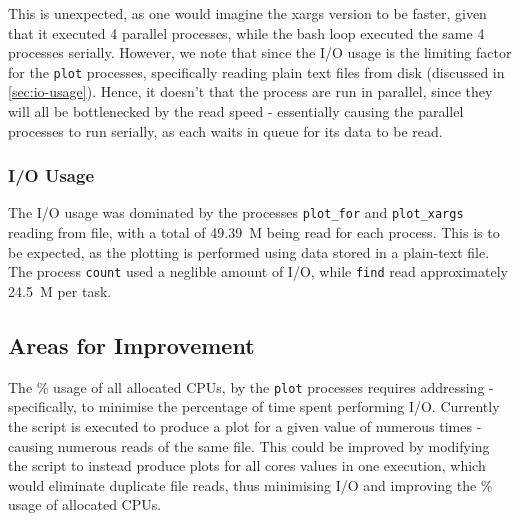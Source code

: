 \documentclass{article}
\begin{document}
This is unexpected, as one would imagine the xargs version to be faster, given
that it executed 4 parallel processes, while the bash loop executed the same 4
processes serially.
However, we note that since the I/O usage is the limiting factor for the
\lstinline{plot} processes, specifically reading plain text files from disk
(discussed in \autoref{sec:io-usage}).
Hence, it doesn't that the process are run in parallel, since they will all be
bottlenecked by the read speed - essentially causing the parallel processes to
run serially, as each waits in queue for its data to be read.

\subsubsection{I/O Usage}
\label{sec:io-usage}

The I/O usage was dominated by the processes \lstinline{plot_for} and
\lstinline{plot_xargs} reading from file, with a total of \SI{49.39}{M} being
read for each process.
This is to be expected, as the plotting is performed using data stored in a
plain-text file.
The process \lstinline{count} used a neglible amount of I/O, while
\lstinline{find} read approximately \SI{24.5}{M} per task.

\subsection{Areas for Improvement}
\label{sec:areas-improvement}

The \% usage of all allocated CPUs, by the \lstinline{plot} processes requires
addressing - specifically, to minimise the percentage of time spent performing
I/O.
Currently the script  is executed to produce a plot
for a given value of  numerous times - causing numerous reads
of the same file.
This could be improved by modifying the script to instead produce plots for all
cores values in one execution, which would eliminate duplicate file reads, thus
minimising I/O and improving the \% usage of allocated CPUs.
\end{document}

